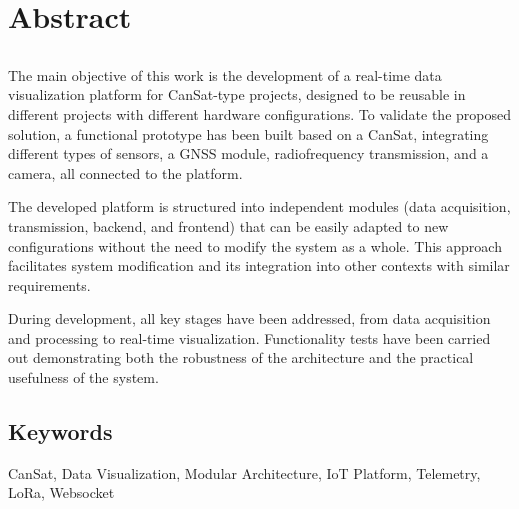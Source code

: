 \chapter*{Abstract}

\section*{\tituloPortadaEngVal}

The main objective of this work is the development of a real-time data visualization platform for CanSat-type projects, designed to be reusable in different projects with different hardware configurations.  
To validate the proposed solution, a functional prototype has been built based on a CanSat, integrating different types of sensors, a GNSS module, radiofrequency transmission, and a camera, all connected to the platform.

The developed platform is structured into independent modules (data acquisition, transmission, backend, and frontend) that can be easily adapted to new configurations without the need to modify the system as a whole.  
This approach facilitates system modification and its integration into other contexts with similar requirements.

During development, all key stages have been addressed, from data acquisition and processing to real-time visualization.  
Functionality tests have been carried out demonstrating both the robustness of the architecture and the practical usefulness of the system.


\section*{Keywords}

\noindent CanSat, Data Visualization, Modular Architecture, IoT Platform, Telemetry, LoRa, Websocket



